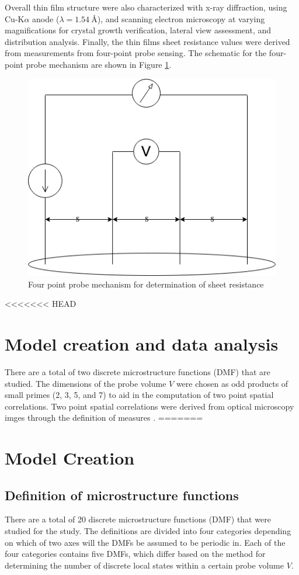 Overall thin film structure were also characterized with x-ray diffraction, using Cu-K$\alpha$ anode ($\lambda = \SI{1.54}{\angstrom}$), and scanning electron microscopy at varying magnifications for crystal growth verification, lateral view assessment, and distribution analysis.
Finally, the thin films sheet resistance values were derived from measurements from four-point probe sensing.
The schematic for the four-point probe mechanism are shown in Figure \ref{fig:fpt}.

\begin{figure}
  \centering
  \includegraphics[scale=0.3]{FourPoint}
  \caption{Four point probe mechanism for determination of sheet resistance}
  \label{fig:fpt}
\end{figure}

<<<<<<< HEAD
\section{Model creation and data analysis}
There are a total of two discrete microstructure functions (DMF) that are studied.
The dimensions of the probe volume $V$ were chosen as odd products of small primes (2, 3, 5, and 7) to aid in the computation of two point spatial correlations.
Two point spatial correlations were derived from optical microscopy imges through the definition of measures \cite{gupta15}.
=======
\section{Model Creation}
\subsection{Definition of microstructure functions}
There are a total of 20 discrete microstructure functions (DMF) that were studied for the study.
The definitions are divided into four categories depending on which of two axes will the DMFs be assumed to be periodic in.
Each of the four categories contains five DMFs, which differ based on the method for determining the number of discrete local states within a certain probe volume $V$.

